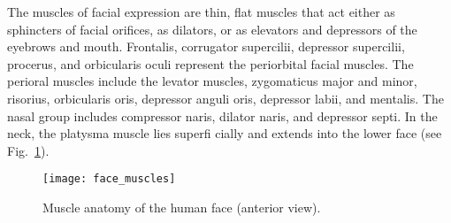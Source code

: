 The muscles of facial expression are thin, flat muscles that act either as sphincters of facial orifices, as dilators, or as elevators and depressors of the eyebrows and mouth. Frontalis, corrugator supercilii, depressor supercilii, procerus, and orbicularis oculi represent the periorbital facial muscles. The perioral muscles include the levator muscles, zygomaticus major and minor, risorius, orbicularis oris, depressor anguli oris, depressor labii, and mentalis. The nasal group includes compressor naris, dilator naris, and depressor septi. In the neck, the platysma muscle lies superfi cially and extends into the lower face (see Fig.~\ref{fig:facemuscles}).\cite{Prendergast2013anatomy}


\begin{figure}
    \centering
    \texttt{[image: face\_muscles]}
    \caption{Muscle anatomy of the human face (anterior view).\cite{Prendergast2013anatomy}}
    \label{fig:facemuscles}
\end{figure}


